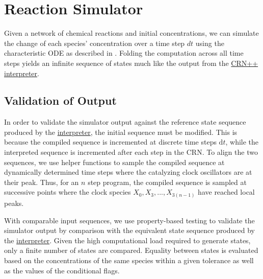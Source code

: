 \section{Reaction Simulator} %
Given a network of chemical reactions and initial concentrations, we can simulate the change of each species' concentration over a time step $dt$ using the characteristic ODE as described in \cite{soloveichik2018a}. Folding the computation across all time steps yields an infinite sequence of states much like the output from the \hyperref[sec:interpreter]{CRN++ interpreter}.

\subsection{Validation of Output}
In order to validate the simulator output against the reference state sequence produced by the \hyperref[sec:interpreter]{interpreter}, the initial sequence must be modified. This is because the compiled sequence is incremented at discrete time steps $\mathrm{d}t$, while the interpreted sequence is incremented after each step in the CRN. To align the two sequences, we use helper functions to sample the compiled sequence at dynamically determined time steps where the catalyzing clock oscillators are at their peak. Thus, for an $n$ step program, the compiled sequence is sampled at successive points where the clock species $X_0, X_3, ..., X_{3 (n-1)}$ have reached local peaks. 

With comparable input sequences, we use property-based testing to validate the simulator output by comparison with the equivalent state sequence produced by the \hyperref[sec:interpreter]{interpreter}. Given the high computational load required to generate states, only a finite number of states are compared. Equality between states is evaluated based on the concentrations of the same species within a given tolerance as well as the values of the conditional flags.  
